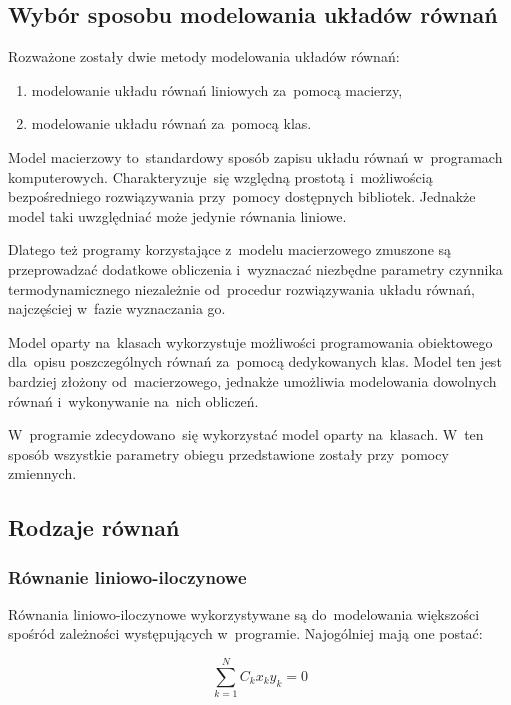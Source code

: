 \subsection{Wybór sposobu modelowania układów równań}

Rozważone zostały dwie metody modelowania układów równań:

\begin{enumerate}

	\item modelowanie układu równań liniowych za~pomocą macierzy,

	\item modelowanie układu równań za~pomocą klas.

\end{enumerate}

Model macierzowy to~standardowy sposób zapisu układu równań w~programach
komputerowych. Charakteryzuje~się względną prostotą i~możliwością
bezpośredniego rozwiązywania przy~pomocy dostępnych bibliotek. Jednakże
model taki uwzględniać może jedynie równania liniowe.

Dlatego też programy korzystające z~modelu macierzowego zmuszone są
przeprowadzać dodatkowe obliczenia i~wyznaczać niezbędne parametry
czynnika termodynamicznego niezależnie od~procedur rozwiązywania układu
równań, najczęściej w~fazie wyznaczania go.

Model oparty na~klasach wykorzystuje możliwości programowania
obiektowego dla~opisu poszczególnych równań za~pomocą dedykowanych klas.
Model ten jest bardziej złożony od~macierzowego, jednakże umożliwia
modelowania dowolnych równań i~wykonywanie na~nich obliczeń.

W~programie zdecydowano~się wykorzystać model oparty na~klasach. W~ten
sposób wszystkie parametry obiegu przedstawione zostały przy~pomocy
zmiennych.


\subsection{Rodzaje równań}

\subsubsection{Równanie liniowo-iloczynowe}

Równania liniowo-iloczynowe wykorzystywane są do~modelowania większości
spośród zależności występujących w~programie. Najogólniej mają one
postać:

\begin{equation}
	\sum_{k=1}^N C_k x_k y_k = 0
\end{equation}

